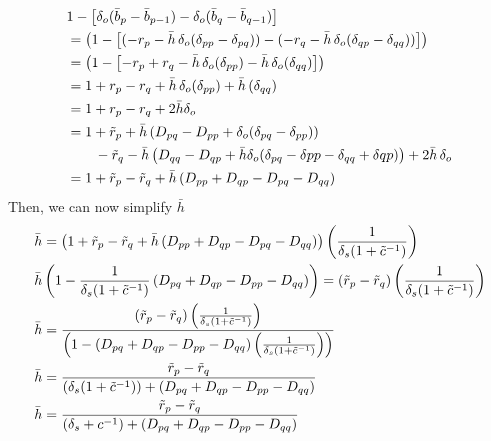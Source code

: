 \documentclass{article}
\theoremstyle{plain}
\begin{document}
\begin{align}
&1 - \left[ \delta_o ( \bar{b}_p - \bar{b}_{p-1} ) - \delta_o ( \bar{b}_q - \bar{b}_{q-1} ) \right] \\
&= \left( 1 - \left[ (-r_p - \bar{h}\, \delta_o (\delta_{pp} - \delta_{pq})) - (-r_q - \bar{h}\, \delta_o (\delta_{qp} - \delta_{qq})) \right] \right)
\notag \\
&= \left( 1 - \left[ -r_p + r_q - \bar{h}\, \delta_o (\delta_{pp}) - \bar{h}\, \delta_o (\delta_{qq}) \right] \right)\notag \\
&= 1 + r_p - r_q + \bar{h}\, \delta_o (\delta_{pp}) + \bar{h}\, (\delta_{qq}) \notag \\
&= 1 + r_p - r_q + 2 \bar{h} \delta_o  \\
  &= 1 + \tilde{r}_p  + \bar{h} \left( D_{pq} - D_{pp} + \delta_o ( \delta_{pq} - \delta_{pp} ) \right) \notag \\
  & \qquad - \tilde{r}_q  - \bar{h} \left( D_{qq} - D_{qp} + \bar{h} \delta_o ( \delta_{pq} - \delta{pp} - \delta_{qq} + \delta{qp} ) \right)  + 2 \bar{h} \, \delta_o \\
  &= 1 + \tilde{r}_p - \tilde{r}_q 
     + \bar{h} \left( D_{pp} + D_{qp} - D_{pq} - D_{qq} \right) 
     \end{align}
     Then, we can now simplify $\bar{h}$
     \begin{align}
     &\bar{h} =  \left( 1 + \tilde{r}_p - \tilde{r}_q 
     + \bar{h} \left( D_{pp} + D_{qp} - D_{pq} - D_{qq} \right) \right)\left( \frac{1}{\delta_s (1 + \tilde{c}^{-1})} \right) \notag \\
&\bar{h} \left( 1 - \frac{1}{\delta_s (1 + \tilde{c}^{-1})} 
   \left( D_{pq} + D_{qp} - D_{pp} - D_{qq} \right) \right) 
   = \left( \tilde{r}_p - \tilde{r}_q \right) 
      \left( \frac{1}{\delta_s (1 + \tilde{c}^{-1})} \right) \notag \\
& \bar{h} 
= \dfrac{ \left( \tilde{r}_p - \tilde{r}_q \right) 
      \left( \frac{1}{\delta_s (1 + \tilde{c}^{-1})} \right) }
      { \left( 1 - \left( D_{pq} + D_{qp} - D_{pp} - D_{qq} \right) 
         \left( \frac{1}{\delta_s (1 + \tilde{c}^{-1})} \right) \right) } \notag \\
     & \bar{h} = \dfrac{  \tilde{r}_p - \tilde{r}_q   }{ (\delta_s (1 + \tilde{c}^{-1})) + \left( D_{pq} + D_{qp} - D_{pp} - D_{qq} \right)} \notag \\
     & \bar{h} = \dfrac{  \tilde{r}_p - \tilde{r}_q   }{ (\delta_s + c^{-1}) + \left( D_{pq} + D_{qp} - D_{pp} - D_{qq} \right)} \notag \\
\end{align}
\end{document}
